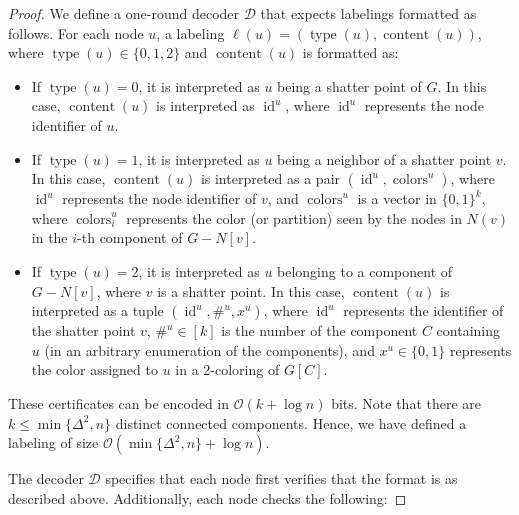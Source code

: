 \documentclass[11pt]{article}
\DeclareMathOperator{\colors}{colors}
\DeclareMathOperator{\content}{content}
\DeclareMathOperator{\id}{id}
\DeclareMathOperator{\type}{type}
\newcommand*{\cO}{\mathcal{O}}
\begin{document}
\restateThmShatterPoint*




\begin{proof}
We define a one-round decoder \( \mathcal{D} \) that expects labelings formatted as follows. For each node \( u \), a labeling \( \ell(u) = (\type(u), \content(u)) \), where \( \type(u) \in \{0, 1, 2\} \) and $\content(u)$ is formatted as:

\begin{itemize}
\item If \( \type(u) = 0 \), it is interpreted as \( u \) being a shatter point of \( G \). In this case, \( \content(u) \) is interpreted as \( \id^u \), where \( \id^u \) represents the node identifier of \( u \).  

\item If \( \type(u) = 1 \), it is interpreted as \( u \) being a neighbor of a shatter point \( v \). In this case, \( \content(u) \) is interpreted as a pair \( (\id^u, \colors^u) \), where \( \id^u \) represents the node identifier of \( v \), and \( \colors^u \) is a vector in \( \{0,1\}^k \), where \( \colors^u_i \) represents the color (or partition) seen by the nodes in \( N(v) \) in the \( i \)-th component of \( G - N[v] \).
\item If \( \type(u) = 2 \), it is interpreted as \( u \) belonging to a component of \( G - N[v] \), where \( v \) is a shatter point. In this case, \( \content(u) \) is interpreted as a tuple \( (\id^u, \#^u, x^u) \), where \( \id^u \) represents the identifier of the shatter point \( v \), \( \#^u \in [k] \) is the number of the component \( C \) containing \( u \) (in an arbitrary enumeration of the components), and \( x^u \in \{0,1\} \) represents the color assigned to \( u \) in a 2-coloring of \( G[C] \). 

\end{itemize}

These certificates can be encoded in $\cO(k + \log n)$ bits. Note that there are \( k \leq \min\{\Delta^2, n\} \) distinct connected components. Hence, we have defined a labeling of size $\cO(\min\{\Delta^2,n\} + \log n)$.

The decoder \( \mathcal{D} \) specifies that each node first verifies that the format is as described above. Additionally, each node checks the following:


\end{proof}
\end{document}
